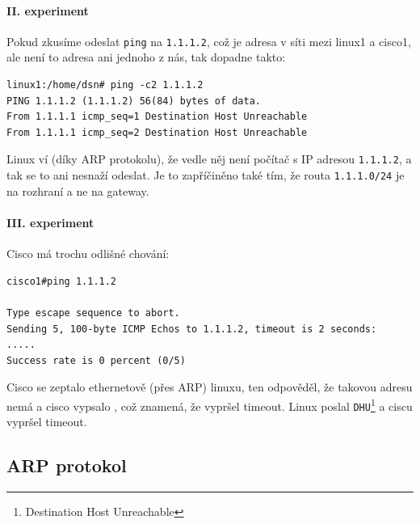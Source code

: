 \paragraph{II. experiment}
Pokud zkusíme odeslat \verb|ping| na \verb|1.1.1.2|, což je adresa v síti mezi linux1 a cisco1, ale není to adresa ani jednoho z nás, tak dopadne takto:
\begin{verbatim}
linux1:/home/dsn# ping -c2 1.1.1.2
PING 1.1.1.2 (1.1.1.2) 56(84) bytes of data.
From 1.1.1.1 icmp_seq=1 Destination Host Unreachable
From 1.1.1.1 icmp_seq=2 Destination Host Unreachable
\end{verbatim} 
Linux ví (díky ARP protokolu), že vedle něj není počítač s IP adresou \verb|1.1.1.2|, a tak se to ani nesnaží odeslat. Je to zapříčiněno také tím, že routa \verb|1.1.1.0/24| je na rozhraní a ne na gateway.
\newline

\paragraph{III. experiment}
Cisco má trochu odlišné chování:
\begin{verbatim}
cisco1#ping 1.1.1.2

Type escape sequence to abort.
Sending 5, 100-byte ICMP Echos to 1.1.1.2, timeout is 2 seconds:
.....
Success rate is 0 percent (0/5)
\end{verbatim}
Cisco se zeptalo ethernetově (přes ARP) linuxu, ten odpověděl, že takovou adresu nemá a cisco vypsalo , což znamená, že vypršel timeout. Linux poslal \verb|DHU|\footnote{Destination Host Unreachable} a ciscu vypršel timeout.


\newpage

\subsection{ARP protokol} \label{arp}
\cite{wiki:arp}

